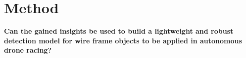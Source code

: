 \chapter{Method}
\label{sec:method}

\begin{center}
	\textbf{Can the gained insights be used to build a lightweight and robust detection model for wire frame objects to be applied in autonomous drone racing?}
\end{center}
